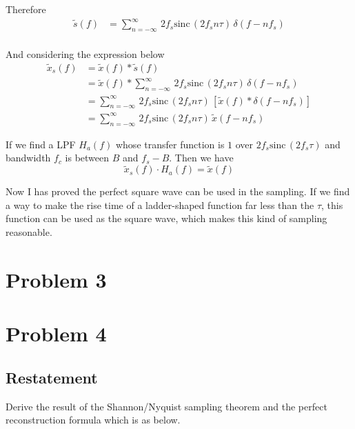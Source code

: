 \documentclass{article}
\begin{document}
Therefore
\begin{equation}
    \begin{aligned}
        \widetilde{s}(f) &= \sum_{n = -\infty}^{\infty}\, 2f_s \mathrm{sinc}\, ( 2f_s n\tau)\, \delta(f - nf_s) \\
    \end{aligned}
\end{equation}

And considering the expression below
\begin{equation}
    \begin{aligned}
        \widetilde{x}_s(f) &= \widetilde{x}(f) * \widetilde{s}(f)\\
        &= \widetilde{x}(f) * \sum_{n = -\infty}^{\infty}\, 2f_s \mathrm{sinc}\, ( 2f_s n\tau)\, \delta(f - nf_s) \\
        &= \sum_{n = -\infty}^{\infty}\, 2f_s \mathrm{sinc}\, ( 2f_s n\tau)\, \left[ \widetilde{x}(f) *\delta(f - nf_s) \right] \\
        &= \sum_{n = -\infty}^{\infty}\,2f_s \mathrm{sinc}\, ( 2f_s n\tau)\, \widetilde{x}(f - nf_s)
    \end{aligned}
\end{equation}

If we find a LPF $H_a(f)$ whose transfer function is $1$ over $2f_s \mathrm{sinc}\, ( 2f_s\tau)$ and bandwidth $f_c$ is between $B$ and $f_s - B$. Then we have
\begin{equation}
    \widetilde{x}_s(f) \cdot H_a(f) = \widetilde{x}(f)
\end{equation}

Now I has proved the perfect square wave can be used in the sampling. If we find a way to make the rise time of a ladder-shaped function far less than the $\tau$, this function can be used as the square wave, which makes this kind of sampling reasonable.


\section{Problem 3}

\section{Problem 4}
\subsection{Restatement}
Derive the result of the Shannon/Nyquist sampling theorem and the perfect reconstruction formula which is as below.
\end{document}
